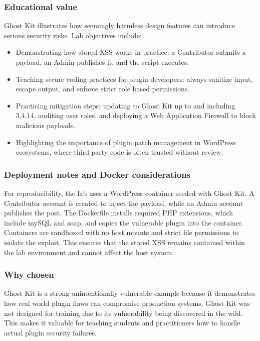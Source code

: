 \documentclass[12pt,titlepage]{article}
\begin{document}
\subsubsection*{Educational value}
Ghost Kit illustrates how seemingly harmless design features can introduce serious security risks. Lab objectives include:
\begin{itemize}
    \item Demonstrating how stored XSS works in practice: a Contributor submits a payload, an Admin publishes it, and the script executes.
    \item Teaching secure coding practices for plugin developers: always sanitize input, escape output, and enforce strict role based permissions.
    \item Practicing mitigation steps: updating to Ghost Kit up to and including 3.4.14, auditing user roles, and deploying a Web Application Firewall to block malicious payloads.
    \item Highlighting the importance of plugin patch management in WordPress ecosystems, where third party code is often trusted without review.
\end{itemize}

\subsubsection*{Deployment notes and Docker considerations}
For reproducibility, the lab uses a WordPress container seeded with Ghost Kit. A Contributor account is created to inject the payload, while an Admin account publishes the post. The Dockerfile installs required PHP extensions, which include mySQL and soap, and copies the vulnerable plugin into the container. Containers are sandboxed with no host mounts and strict file permissions to isolate the exploit. This ensures that the stored XSS remains contained within the lab environment and cannot affect the host system.

\subsubsection*{Why chosen}
Ghost Kit is a strong unintentionally vulnerable example because it demonstrates how real world plugin flaws can compromise production systems. Ghost Kit was not designed for training due to its vulnerability being discovered in the wild. This makes it valuable for teaching students and practitioners how to handle actual plugin security failures.
\end{document}
